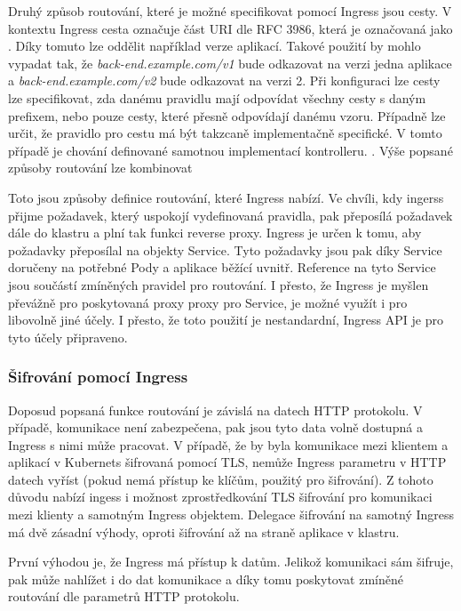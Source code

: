 Druhý způsob routování, které je možné specifikovat pomocí Ingress jsou cesty. V kontextu Ingress cesta označuje část URI dle RFC 3986, která je označovaná jako . Díky tomuto lze oddělit například verze aplikací. Takové použití by mohlo vypadat tak, že \textit{back-end.example.com/v1} bude odkazovat na verzi jedna aplikace a \textit{back-end.example.com/v2} bude odkazovat na verzi 2. Při konfiguraci lze cesty lze specifikovat, zda danému pravidlu mají odpovídat všechny cesty s daným prefixem, nebo pouze cesty, které přesně odpovídají danému vzoru. Případně lze určit, že pravidlo pro cestu má být takzcaně implementačně specifické. V tomto případě je chování definované samotnou implementací kontrolleru. \cite{thekubernetesauthors_2022_ingress}. Výše popsané způsoby routování lze kombinovat

Toto jsou způsoby definice routování, které Ingress nabízí. Ve chvíli, kdy ingerss přijme požadavek, který uspokojí vydefinovaná pravidla, pak přeposílá požadavek dále do klastru a plní tak funkci reverse proxy. Ingress je určen k tomu, aby požadavky přeposílal na objekty Service. Tyto požadavky jsou pak díky Service doručeny na potřebné Pody a aplikace běžící uvnitř. Reference na tyto Service jsou součástí zmíněných pravidel pro routování. I přesto, že Ingress je myšlen převážně pro poskytovaná proxy proxy pro Service, je možné využít i pro libovolně jiné účely. I přesto, že toto použití je nestandardní, Ingress API je pro tyto účely připraveno.\

\subsubsection{Šifrování pomocí Ingress}
Doposud popsaná funkce routování je závislá na datech HTTP protokolu. V případě, komunikace není zabezpečena, pak jsou tyto data volně dostupná a Ingress s nimi může pracovat. V případě, že by byla komunikace mezi klientem a aplikací v Kubernets šifrovaná pomocí TLS, nemůže Ingress parametru v HTTP datech vyříst (pokud nemá přístup ke klíčům, použitý pro šifrování). Z tohoto důvodu nabízí ingess i možnost zprostředkování TLS šifrování pro komunikaci mezi klienty a samotným Ingress objektem. Delegace šifrování na samotný Ingress má dvě zásadní výhody, oproti šifrování až na straně aplikace v klastru. \cite{poulton_2022_the}

První výhodou je, že Ingress má přístup k datům. Jelikož komunikaci sám šifruje, pak může nahlížet i do dat komunikace a díky tomu poskytovat zmíněné routování dle parametrů HTTP protokolu.

